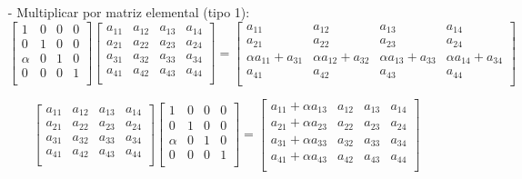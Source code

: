 \begin{itemize}
    \item[-] Multiplicar por matriz elemental (tipo 1):
    \[
    \begin{bmatrix}
    1 & 0 & 0 & 0 \\
    0 & 1 & 0 & 0 \\
    \alpha & 0 & 1 & 0 \\
    0 & 0 & 0 & 1 \\
    \end{bmatrix}
    \begin{bmatrix}
    a_{11} & a_{12} & a_{13} & a_{14} \\
    a_{21} & a_{22} & a_{23} & a_{24} \\
    a_{31} & a_{32} & a_{33} & a_{34} \\
    a_{41} & a_{42} & a_{43} & a_{44} \\
    \end{bmatrix}
    =
    \begin{bmatrix}
    a_{11} & a_{12} & a_{13} & a_{14} \\
    a_{21} & a_{22} & a_{23} & a_{24} \\
    \alpha a_{11} + a_{31} & \alpha a_{12} + a_{32} & \alpha a_{13} + a_{33} & \alpha a_{14} + a_{34} \\
    a_{41} & a_{42} & a_{43} & a_{44} \\
    \end{bmatrix}
    \]
    
    \[
    \begin{bmatrix}
    a_{11} & a_{12} & a_{13} & a_{14} \\
    a_{21} & a_{22} & a_{23} & a_{24} \\
    a_{31} & a_{32} & a_{33} & a_{34} \\
    a_{41} & a_{42} & a_{43} & a_{44} \\
    \end{bmatrix}
    \begin{bmatrix}
    1 & 0 & 0 & 0 \\
    0 & 1 & 0 & 0 \\
    \alpha & 0 & 1 & 0 \\
    0 & 0 & 0 & 1 \\
    \end{bmatrix}
    =
    \begin{bmatrix}
    a_{11} + \alpha a_{13} & a_{12} & a_{13} & a_{14} \\
    a_{21} + \alpha a_{23} & a_{22} & a_{23} & a_{24} \\
    a_{31} + \alpha a_{33} & a_{32} & a_{33} & a_{34} \\
    a_{41} + \alpha a_{43} & a_{42} & a_{43} & a_{44} \\
    \end{bmatrix}
    \]
    

\end{itemize}
